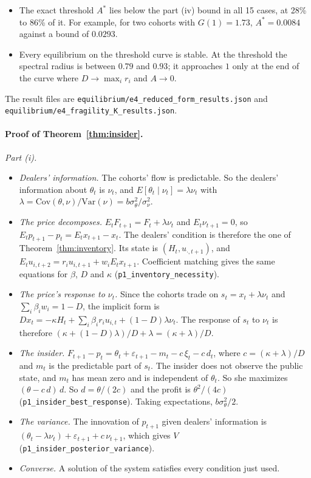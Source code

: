 \begin{itemize}[itemsep=1pt,topsep=2pt]
\item The exact threshold $A^*$ lies below the part (iv) bound in all 15 cases, at 28\% to 86\% of it. For example, for two cohorts with $G(1)=1.73$, $A^*=0.0084$ against a bound of $0.0293$.
\item Every equilibrium on the threshold curve is stable. At the threshold the spectral radius is between $0.79$ and $0.93$; it approaches $1$ only at the end of the curve where $D\to\max_ir_i$ and $A\to0$.
\end{itemize}
The result files are \nolinkurl{equilibrium/e4_reduced_form_results.json} and \nolinkurl{equilibrium/e4_fragility_K_results.json}.

\paragraph{Proof of Theorem~\ref{thm:insider}.}
\emph{Part (i).}
\begin{itemize}[itemsep=1pt,topsep=2pt]
\item \emph{Dealers' information.} The cohorts' flow is predictable. So the dealers' information about $\theta_t$ is $\nu_t$, and $E[\theta_t\mid\nu_t]=\lambda\nu_t$ with $\lambda=\mathrm{Cov}(\theta,\nu)/\mathrm{Var}(\nu)=b\sigma_\theta^2/\sigma_\nu^2$.
\item \emph{The price decomposes.} $E_tF_{t+1}=F_t+\lambda\nu_t$ and $E_t\nu_{t+1}=0$, so $E_tp_{t+1}-p_t=E_tx_{t+1}-x_t$. The dealers' condition is therefore the one of Theorem~\ref{thm:inventory}. Its state is $(H_t,u_{\cdot,t+1})$, and $E_tu_{i,t+2}=r_iu_{i,t+1}+w_iE_tx_{t+1}$. Coefficient matching gives the same equations for $\beta$, $D$ and $\kappa$ (\nolinkurl{p1_inventory_necessity}).
\item \emph{The price's response to $\nu_t$.} Since the cohorts trade on $s_t=x_t+\lambda\nu_t$ and $\sum_i\beta_iw_i=1-D$, the implicit form is $Dx_t=-\kappa H_t+\sum_i\beta_ir_iu_{i,t}+(1-D)\lambda\nu_t$. The response of $s_t$ to $\nu_t$ is therefore $(\kappa+(1-D)\lambda)/D+\lambda=(\kappa+\lambda)/D$.
\item \emph{The insider.} $F_{t+1}-p_t=\theta_t+\varepsilon_{t+1}-m_t-c\,\xi_t-c\,d_t$, where $c=(\kappa+\lambda)/D$ and $m_t$ is the predictable part of $s_t$. The insider does not observe the public state, and $m_t$ has mean zero and is independent of $\theta_t$. So she maximizes $(\theta-c\,d)\,d$. So $d=\theta/(2c)$ and the profit is $\theta^2/(4c)$ (\nolinkurl{p1_insider_best_response}). Taking expectations, $b\sigma_\theta^2/2$.
\item \emph{The variance.} The innovation of $p_{t+1}$ given dealers' information is $(\theta_t-\lambda\nu_t)+\varepsilon_{t+1}+c\,\nu_{t+1}$, which gives $V$ (\nolinkurl{p1_insider_posterior_variance}).
\item \emph{Converse.} A solution of the system satisfies every condition just used.
\end{itemize}

